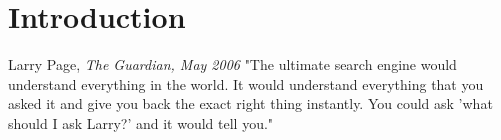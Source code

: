 \chapter{Introduction}




\begin{chapquote}{Larry Page, \textit{The Guardian, May 2006}\cite{motivationquote}}
"The ultimate search engine would understand everything in the world. It would understand everything that you asked it and give you back the exact right thing instantly. You could ask 'what should I ask Larry?' and it would tell you."
\end{chapquote}





%
